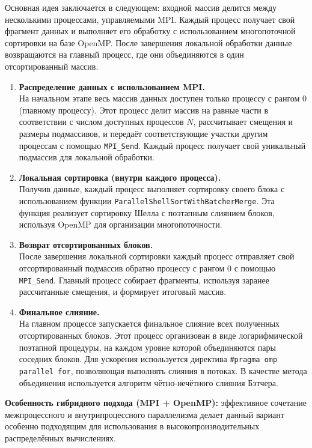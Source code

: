 \documentclass[a4paper,12pt]{article}
\begin{document}
Основная идея заключается в следующем: входной массив делится между несколькими процессами, управляемыми MPI. Каждый процесс получает свой фрагмент данных и выполняет его обработку с использованием многопоточной сортировки на базе OpenMP. После завершения локальной обработки данные возвращаются на главный процесс, где они объединяются в один отсортированный массив.

\begin{enumerate}
    \item \textbf{Распределение данных с использованием MPI.} \\
    На начальном этапе весь массив данных доступен только процессу с рангом 0 (главному процессу). Этот процесс делит массив на равные части в соответствии с числом доступных процессов $N$, рассчитывает смещения и размеры подмассивов, и передаёт соответствующие участки другим процессам с помощью \texttt{MPI\_Send}. Каждый процесс получает свой уникальный подмассив для локальной обработки.

    \item \textbf{Локальная сортировка (внутри каждого процесса).} \\
    Получив данные, каждый процесс выполняет сортировку своего блока с использованием функции \texttt{ParallelShellSortWithBatcherMerge}. Эта функция реализует сортировку Шелла с поэтапным слиянием блоков, используя OpenMP для организации многопоточности.

    \item \textbf{Возврат отсортированных блоков.} \\
    После завершения локальной сортировки каждый процесс отправляет свой отсортированный подмассив обратно процессу с рангом 0 с помощью \texttt{MPI\_Send}. Главный процесс собирает фрагменты, используя заранее рассчитанные смещения, и формирует итоговый массив.

    \item \textbf{Финальное слияние.} \\
    На главном процессе запускается финальное слияние всех полученных отсортированных блоков. Этот процесс организован в виде логарифмической поэтапной процедуры, на каждом уровне которой объединяются пары соседних блоков. Для ускорения используется директива \texttt{\#pragma omp parallel for}, позволяющая выполнять слияния в потоках. В качестве метода объединения используется алгоритм чётно-нечётного слияния Бэтчера.
\end{enumerate}
\textbf{Особенность гибридного подхода (MPI + OpenMP):} эффективное сочетание межпроцессного и внутрипроцессного параллелизма  делает данный вариант особенно подходящим для использования в высокопроизводительных распределённых вычислениях.
\end{document}
